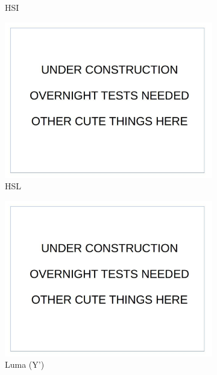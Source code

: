 \documentclass[12pt]{report}
\begin{document}
\begin{figure}
\begin{subfigure}{.49\linewidth}
  \caption{HSI}
\end{subfigure}
\hfill
\begin{subfigure}{.49\linewidth}
  \includegraphics[width=1\linewidth]{figures/placeholder.jpg}
  \caption{HSL}
\end{subfigure}
\hfill
\begin{subfigure}{.49\linewidth}
  \includegraphics[width=1\linewidth]{figures/placeholder.jpg}
  \caption{Luma (Y')}
\end{subfigure}
\hfill
\begin{subfigure}{.49\linewidth}

\end{subfigure}
\end{figure}
\end{document}
